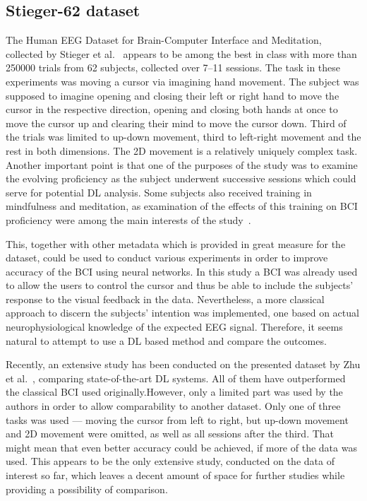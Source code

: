 \documentclass[english, he, bc, kiv, iso690alph]{fasthesis}
\begin{document}

\subsection{Stieger-62 dataset}

The Human EEG Dataset for Brain-Computer Interface and Meditation, collected by Stieger et al.~\cite{data:stieger:21} appears to be among the best in class with more than 250000 trials from 62 subjects, collected over 7--11 sessions.
The task in these experiments was moving a cursor via imagining hand movement. The subject was supposed to imagine opening and closing their left or right hand to move the cursor in the respective direction, opening and closing both hands at once to move the cursor up and clearing their mind to move the cursor down. Third of the trials was limited to up-down movement, third to left-right movement and the rest in both dimensions.
The 2D movement is a relatively uniquely complex task.
Another important point is that one of the purposes of the study was to examine the evolving proficiency as the subject underwent successive sessions which could serve for potential DL analysis.
Some subjects also received training in mindfulness and meditation, as examination of the effects of this training on BCI proficiency were among the main interests of the study~\cite{stieger:mindfulness:20}.

This, together with other metadata which is provided in great measure for the dataset, could be used to conduct various experiments in order to improve accuracy of the BCI using neural networks.
In this study a BCI was already used to allow the users to control the cursor and thus be able to include the subjects' response to the visual feedback in the data. Nevertheless, a more classical approach to discern the subjects' intention was implemented, one based on actual neurophysiological knowledge of the expected EEG signal. Therefore, it seems natural to attempt to use a DL based method and compare the outcomes.

Recently, an extensive study has been conducted on the presented dataset by Zhu et al.~\cite{zhu:dl:bci:mi:22}, comparing state-of-the-art DL systems. All of them have outperformed the classical BCI used originally.\@ However, only a limited part was used by the authors in order to allow comparability to another dataset. Only one of three tasks was used --- moving the cursor from left to right, but up-down movement and 2D movement were omitted, as well as all sessions after the third.
That might mean that even better accuracy could be achieved, if more of the data was used.
This appears to be the only extensive study, conducted on the data of interest so far, which leaves a decent amount of space for further studies while providing a possibility of comparison.
\end{document}
